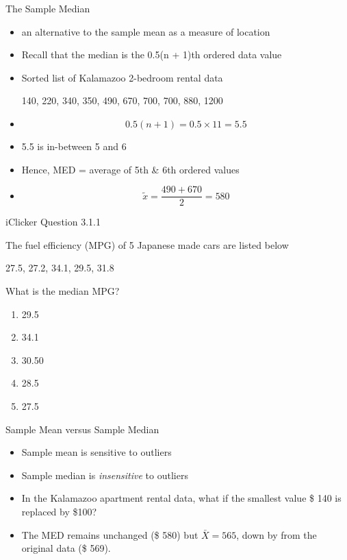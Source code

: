 \documentclass[14pt]{beamer}\usepackage[]{graphicx}\usepackage[]{color}
\begin{document}
\begin{frame}[fragile]{The Sample Median}



{\footnotesize{
\begin{itemize}
\item<1-> an alternative to the sample mean as a measure of location

\item<1-> Recall that the median is the 0.5(n + 1)th ordered data value

\item<1-> Sorted list of Kalamazoo 2-bedroom rental data

\vspace{3mm}

140, 220, 340, 350, 490, 670, 700, 700, 880, 1200
\item<2->
\begin{equation*}
0.5(n + 1) = 0.5 \times 11 = 5.5
\end{equation*}

\item<3-> 5.5 is in-between 5 and 6
\item<4-> Hence, MED = average of 5th \& 6th ordered values
\item<5->
\begin{equation*}
\tilde{x} = \frac{ 490 + 670 }{2} = 580
\end{equation*}
\end{itemize}
}}
\end{frame}

\begin{frame}[fragile]{iClicker Question 3.1.1}


The fuel efficiency (MPG) of 5 Japanese made cars are listed below

\begin{center}
27.5, 27.2, 34.1, 29.5, 31.8
\end{center}

What is the median MPG?

\begin{enumerate}
\item 29.5
\item 34.1
\item 30.50
\item 28.5
\item 27.5
\end{enumerate}
\end{frame}

\begin{frame}[fragile]{Sample Mean versus Sample Median}

\begin{itemize}
\item<1-> Sample mean is sensitive to outliers
\item<2-> Sample median is \textit{insensitive} to outliers
\item<3-> In the Kalamazoo apartment rental data, what if the smallest value \$ 140 is replaced by \$100?
\item<4-> The MED remains unchanged (\$ 580) but $\bar{X} = 565$, down by from the original data (\$ 569).
\end{itemize}
\end{frame}
\end{document}
